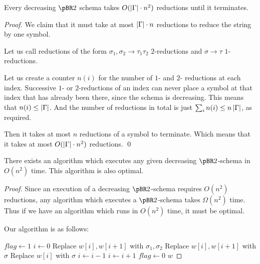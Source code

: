 \documentclass{llncs}
\newcounter{algo}
\begin{document}
\begin{lemma}

    Every decreasing $\pBR2$ schema takes $O(\left|\Gamma\right|\cdot n^2)$ reductions until it terminates.

\end{lemma}

\begin{proof}

    We claim that it  must take at most $\left|\Gamma\right|\cdot n$ reductions to reduce the string by one symbol.

    Let us call reductions of the form $\sigma_1,\sigma_2\to\tau_1\tau_2$ $2$-reductions and $\sigma\to\tau$
    $1$-reductions.

    Let us create a counter $n(i)$ for the number of $1$- and $2$- reductions at each index.
    Successive $1$- or $2$-reductions of an index can never place a symbol at that index that has already been
    there, since the schema is decreasing.
    This means that $n(i)\leq\left|\Gamma\right|$.
    And the number of reductions in total is just $\sum_in(i)\leq n\left|\Gamma\right|$, as required.

    Then it takes at most $n$ reductions of a symbol to terminate.
    Which means that it takes at most $O(\left|\Gamma\right|\cdot n^2)$ reductions.
    \qed

\end{proof}

\begin{lemma}

    There exists an algorithm which executes any given decreasing $\pBR2$-schema in $O(n^2)$ time.
    This algorithm is also optimal.

\end{lemma}

\begin{proof}

    Since an execution of a decreasing $\pBR2$-schema requires $O(n^2)$ reductions, any algorithm which
    executes a $\pBR2$-schema takes $\Omega(n^2)$ time.
    Thus if we have an algorithm which runs in $O(n^2)$ time, it must be optimal.

    Our algorithm is as follows:

    \def\flag{\mathit{flag}}
    \algorithm
            \State $\flag\gets1$
            \State $i\gets0$
            \While{$\flag$}
                    Replace $w[i],w[i+1]$ with $\sigma_1,\sigma_2$
                    Replace $w[i],w[i+1]$ with $\sigma$
                    Replace $w[i]$ with $\sigma$
                    \lIf{$\sigma\neq\epsilon$} $i\gets i-1$
                \Else
                    \State $i\gets i+1$
                     $\flag\gets0$
                \EndIf
            \EndWhile
            \State\Return $w$
        \EndFunc
    \ealgorithm

\end{proof}
\end{document}
